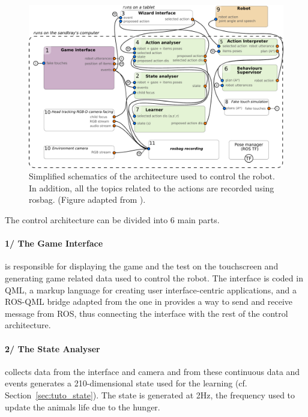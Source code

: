 \begin{figure}[ht]
	\centering
	\includegraphics[width=1\textwidth]{architecture.pdf}
	\caption{Simplified schematics of the architecture used to control the robot. In addition, all the topics related to the actions are recorded using rosbag. (Figure adapted from \citealt{lemaignan2017free}).}
	\label{fig:tutoring_arch}
\end{figure}


The control architecture can be divided into 6 main parts.

\paragraph{1/ The Game Interface} is responsible for displaying the game and the test on the touchscreen and generating game related data used to control the robot. The interface is coded in QML, a markup language for creating user interface-centric applications, and a ROS-QML bridge adapted from the one in \cite{lemaignan2017free} provides a way to send and receive message from ROS, thus connecting the interface with the rest of the control architecture.

\paragraph{2/ The State Analyser} collects data from the interface and camera and from these continuous data and events generates a 210-dimensional state used for the learning (cf. Section~\ref{sec:tuto_state}). The state is generated at 2Hz, the frequency used to update the animals life due to the hunger.

